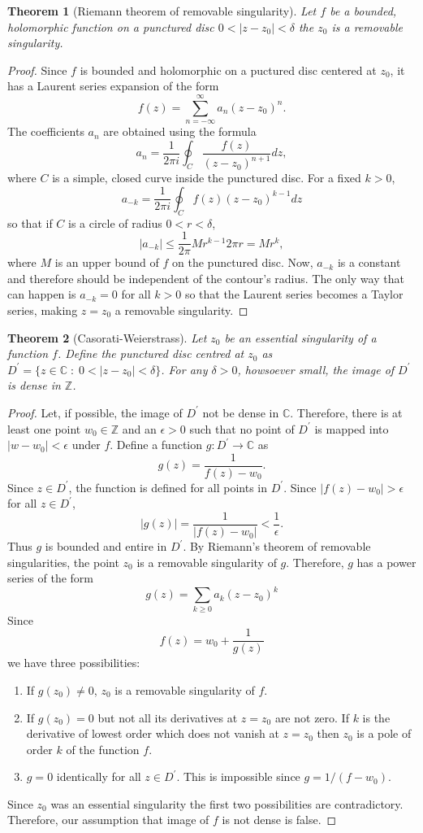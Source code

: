 \documentclass{article}
\theoremstyle{plain}
\newtheorem{thm}{Theorem}
\numberwithin{thm}{section}
\theoremstyle{plain}
\numberwithin{prop}{section}
\theoremstyle{plain}
\numberwithin{prop}{section}
\theoremstyle{definition}
\numberwithin{defn}{section}
\theoremstyle{remark}
\numberwithin{equation}{section}
\newcommand{\op}{\prime}
\begin{document}
\begin{thm}[Riemann theorem of removable singularity]\label{s1at2}
Let $f$ be a bounded, holomorphic function on a punctured disc $0 < |z - z_0|
< \delta$ the $z_0$ is a removable singularity.
\end{thm}
\begin{proof}
Since $f$ is bounded and holomorphic on a puctured disc centered at $z_0$, it
has a Laurent series expansion of the form
\[
f(z) = \sum_{n = -\infty}^\infty a_n(z - z_0)^n.
\]
The coefficients $a_n$ are obtained using the formula
\[
a_n = \frac{1}{2\pi i}\oint_C \frac{f(z)}{(z - z_0)^{n + 1}}dz,
\]
where $C$ is a simple, closed curve inside the punctured disc. For a fixed
$k > 0$,
\[
a_{-k} = \frac{1}{2\pi i}\oint_C f(z)(z - z_0)^{k - 1}dz
\]
so that if $C$ is a circle of radius $0 < r < \delta$,
\[
|a_{-k}| \le \frac{1}{2\pi}Mr^{k - 1}2\pi r = Mr^k,
\]
where $M$ is an upper bound of $f$ on the punctured disc. Now, $a_{-k}$ is
a constant and therefore should be independent of the contour's radius. The
only way that can happen is $a_{-k} = 0$ for all $k > 0$ so that the Laurent
series becomes a Taylor series, making $z = z_0$ a removable singularity.
\end{proof}

\begin{thm}[Casorati-Weierstrass]\label{s1at3}
Let $z_0$ be an essential singularity of a function $f$. Define the punctured
disc centred at $z_0$ as $D^\op = \{z \in \mathbb{C}\;:\; 0 < |z - z_0| < 
\delta\}$. For any $\delta > 0$, howsoever small, the image of $D^\op$ is dense
in $\mathbb{Z}$.
\end{thm}
\begin{proof}
Let, if possible, the image of $D^\op$ not be dense in $\mathbb{C}$. Therefore,
there is at least one point $w_0 \in \mathbb{Z}$ and an $\epsilon > 0$ such that
no point of $D^\op$ is mapped into $|w - w_0| < \epsilon$ under $f$. Define a
function $g: D^\op \rightarrow \mathbb{C}$ as 
\[
g(z) = \frac{1}{f(z) - w_0}.
\]
Since $z \in D^\op$, the function is defined for all points in $D^\op$. Since
$|f(z) - w_0| > \epsilon$ for all $z \in D^\op$, 
\[
|g(z)| = \frac{1}{|f(z) - w_0|} < \frac{1}{\epsilon}.
\]
Thus $g$ is bounded and entire in $D^\op$. By Riemann's theorem of removable
singularities, the point $z_0$ is a removable singularity of $g$. Therefore,
$g$ has a power series of the form
\[
g(z) = \sum_{k \ge 0}a_k(z - z_0)^k
\]
Since
\[
f(z) = w_0 + \frac{1}{g(z)}
\]
we have three possibilities:
\begin{enumerate}
\item If $g(z_0) \ne 0$, $z_0$ is a removable singularity of $f$.
\item If $g(z_0) = 0$ but not all its derivatives at $z = z_0$ are not zero.
If $k$ is the derivative of lowest order which does not vanish at $z = z_0$
then $z_0$ is a pole of order $k$ of the function $f$.
\item $g = 0$ identically for all $z \in D^\op$. This is impossible since 
$g = 1/(f - w_0)$.
\end{enumerate}
Since $z_0$ was an essential singularity the first two possibilities are 
contradictory. Therefore, our assumption that image of $f$ is not dense is false.
\end{proof}
\end{document}
